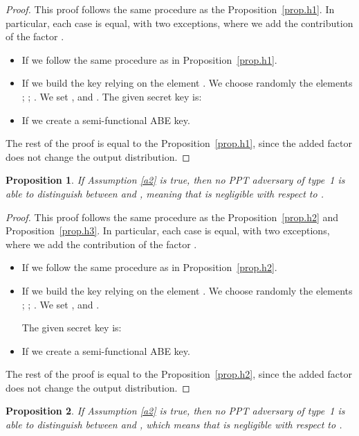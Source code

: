 \documentclass[a4paper,10pt]{article}
\newtheorem{proposition}{Proposition}
\newcommand{\randomchoose}[1]{We choose randomly the element\ifstrequal{#1}{s}{}{s} }
\newcommand{\game}[2]{}
\newcommand{\typeone}{type~1}
\begin{document}
	\begin{proof}
		This proof follows the same procedure as the Proposition~\ref{prop.h1}.
		In particular, each case is equal, with two exceptions, where we add the contribution of the factor .
		\begin{itemize}
			\item
			If  we follow the same procedure as in Proposition~\ref{prop.h1}.
			\item
			If  we build the key relying on the element .
			\randomchoose{p}{;
				;
				.
			}
			We set ,  and .
			The given secret key is:
			
			
			\item
			If  we create a semi-functional ABE key.
		\end{itemize}
		The rest of the proof is equal to the Proposition~\ref{prop.h1}, since the added factor does not change the output distribution.
	\end{proof}
	\begin{proposition}
		\label{prop.h4}
		If Assumption \ref{a2} is true, then no PPT adversary  of \typeone{} is able to distinguish between \game{H^\prime}{k,1} and \game{H^\prime}{k,2}, meaning that  is negligible with respect to .
	\end{proposition}
	\begin{proof}
		This proof follows the same procedure as the Proposition~\ref{prop.h2} and Proposition~\ref{prop.h3}.
		In particular, each case is equal, with two exceptions, where we add the contribution of the factor .
		\begin{itemize}
			\item
			If  we follow the same procedure as in Proposition~\ref{prop.h2}.
			\item
			If  we build the key relying on the element .
			\randomchoose{p}{;
				;
				.
			}
			We set ,  and .
			
			The given secret key is:
			
			\item
			If  we create a semi-functional ABE key.
		\end{itemize}
		The rest of the proof is equal to the Proposition~\ref{prop.h2}, since the added factor does not change the output distribution.
	\end{proof}
	\begin{proposition}
		\label{prop.h5}
		If Assumption \ref{a2} is true, then no PPT adversary  of \typeone{} is able to distinguish between \game{H^\prime}{0,2} and \game{H^{\prime\prime}}{}, which means that  is negligible with respect to .
	\end{proposition}
\end{document}
